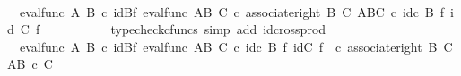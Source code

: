\begin{isabellebody}
\ \ \ \ \ \ \isamarkupfalse%
\ \isamarkupfalse%
\ {\isachardoublequoteopen}{\isachardot}{\kern0pt}{\isachardot}{\kern0pt}{\isachardot}{\kern0pt}\ {\isacharequal}{\kern0pt}{\isacharparenleft}{\kern0pt}eval{\isacharunderscore}{\kern0pt}func\ A\ B{\isacharparenright}{\kern0pt}\ {\isasymcirc}\isactrlsub c\ {\isacharparenleft}{\kern0pt}id{\isacharparenleft}{\kern0pt}B{\isacharparenright}{\kern0pt}{\isasymtimes}\isactrlsub f\ eval{\isacharunderscore}{\kern0pt}func\ {\isacharparenleft}{\kern0pt}A\isactrlbsup B\isactrlesup {\isacharparenright}{\kern0pt}\ C{\isacharparenright}{\kern0pt}\ {\isasymcirc}\isactrlsub c\ {\isacharparenleft}{\kern0pt}associate{\isacharunderscore}{\kern0pt}right\ B\ C\ {\isacharparenleft}{\kern0pt}{\isacharparenleft}{\kern0pt}A\isactrlbsup B\isactrlesup {\isacharparenright}{\kern0pt}\isactrlbsup C\isactrlesup {\isacharparenright}{\kern0pt}{\isacharparenright}{\kern0pt}\ {\isasymcirc}\isactrlsub c\ {\isacharparenleft}{\kern0pt}{\isacharparenleft}{\kern0pt}id\isactrlsub c\ {\isacharparenleft}{\kern0pt}B{\isacharparenright}{\kern0pt}\ {\isasymtimes}\isactrlsub f\ id{\isacharparenleft}{\kern0pt}\ C{\isacharparenright}{\kern0pt}{\isacharparenright}{\kern0pt}\ {\isasymtimes}\isactrlsub f\ {\isasymphi}\isactrlsup {\isasymsharp}\isactrlsup {\isasymsharp}{\isacharparenright}{\kern0pt}{\isachardoublequoteclose}\isanewline
\ \ \ \ \ \ \ \ \isamarkupfalse%
\ {\isacharparenleft}{\kern0pt}typecheck{\isacharunderscore}{\kern0pt}cfuncs{\isacharcomma}{\kern0pt}\ simp\ add{\isacharcolon}{\kern0pt}\ id{\isacharunderscore}{\kern0pt}cross{\isacharunderscore}{\kern0pt}prod{\isacharparenright}{\kern0pt}\isanewline
\ \ \ \ \ \ \isamarkupfalse%
\ \isamarkupfalse%
\ {\isachardoublequoteopen}{\isachardot}{\kern0pt}{\isachardot}{\kern0pt}{\isachardot}{\kern0pt}\ {\isacharequal}{\kern0pt}{\isacharparenleft}{\kern0pt}eval{\isacharunderscore}{\kern0pt}func\ A\ B{\isacharparenright}{\kern0pt}\ {\isasymcirc}\isactrlsub c\ {\isacharparenleft}{\kern0pt}{\isacharparenleft}{\kern0pt}id{\isacharparenleft}{\kern0pt}B{\isacharparenright}{\kern0pt}{\isasymtimes}\isactrlsub f\ eval{\isacharunderscore}{\kern0pt}func\ {\isacharparenleft}{\kern0pt}A\isactrlbsup B\isactrlesup {\isacharparenright}{\kern0pt}\ C{\isacharparenright}{\kern0pt}\ {\isasymcirc}\isactrlsub c\ {\isacharparenleft}{\kern0pt}{\isacharparenleft}{\kern0pt}id\isactrlsub c\ {\isacharparenleft}{\kern0pt}B{\isacharparenright}{\kern0pt}\ {\isasymtimes}\isactrlsub f\ {\isacharparenleft}{\kern0pt}id{\isacharparenleft}{\kern0pt}C{\isacharparenright}{\kern0pt}\ {\isasymtimes}\isactrlsub f\ {\isasymphi}\isactrlsup {\isasymsharp}\isactrlsup {\isasymsharp}{\isacharparenright}{\kern0pt}{\isacharparenright}{\kern0pt}\ {\isasymcirc}\isactrlsub c\ {\isacharparenleft}{\kern0pt}associate{\isacharunderscore}{\kern0pt}right\ B\ C\ {\isacharparenleft}{\kern0pt}A\isactrlbsup {\isacharparenleft}{\kern0pt}B\ {\isasymtimes}\isactrlsub c\ C{\isacharparenright}{\kern0pt}\isactrlesup {\isacharparenright}{\kern0pt}{\isacharparenright}{\kern0pt}{\isacharparenright}{\kern0pt}{\isacharparenright}{\kern0pt}{\isachardoublequoteclose}\isanewline

\end{isabellebody}
